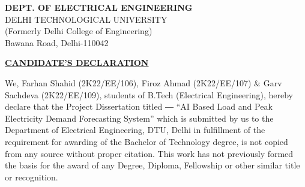 \documentclass[12pt,a4paper]{report}
\begin{document}
\thispagestyle{empty}

\newpage



\newpage




\begin{center}


\begin{center}
\textbf{DEPT. OF ELECTRICAL ENGINEERING}\\

DELHI TECHNOLOGICAL UNIVERSITY \\
(Formerly Delhi College of Engineering) \\
Bawana Road, Delhi-110042\\
\end{center}
\vspace{2 cm}
\textbf{\underline{CANDIDATE’S DECLARATION}}\\
\end{center}
\vspace{1.2cm}
We, Farhan Shahid (2K22/EE/106), Firoz Ahmad (2K22/EE/107) \& Garv Sachdeva (2K22/EE/109), students of B.Tech (Electrical Engineering), hereby declare that the Project Dissertation titled ― “AI Based Load and Peak Electricity Demand Forecasting System” which is submitted by us to the Department of Electrical Engineering, DTU, Delhi in fulfillment of the requirement for awarding of the Bachelor of Technology degree, is not copied from any source without proper citation. This work has not previously formed the basis for the award of any Degree, Diploma, Fellowship or other similar title or recognition.
\end{document}
